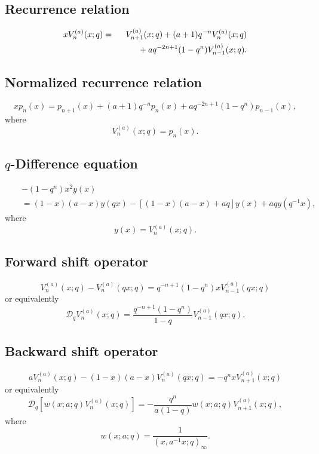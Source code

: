 \documentclass[envcountchap,graybox]{svmono}
\newcommand{\mathindent}{\hspace{7.5mm}}
\begin{document}
{{\subsection*{Recurrence relation}
\begin{eqnarray}
\label{RecAlSalamCarlitzII}
xV_n^{(a)}(x;q)&=&V_{n+1}^{(a)}(x;q)+(a+1)q^{-n}V_n^{(a)}(x;q)\nonumber\\
& &{}\mathindent{}+aq^{-2n+1}(1-q^n)V_{n-1}^{(a)}(x;q).
\end{eqnarray}

\subsection*{Normalized recurrence relation}
\begin{equation}
\label{NormRecAlSalamCarlitzII}
xp_n(x)=p_{n+1}(x)+(a+1)q^{-n}p_n(x)+aq^{-2n+1}(1-q^n)p_{n-1}(x),
\end{equation}
where
$$V_n^{(a)}(x;q)=p_n(x).$$

\subsection*{$q$-Difference equation}
\begin{eqnarray}
\label{dvAlSalamCarlitzII}
& &-(1-q^n)x^2y(x)\nonumber\\
& &{}=(1-x)(a-x)y(qx)-\left[(1-x)(a-x)+aq\right]y(x)+aqy(q^{-1}x),
\end{eqnarray}
where
$$y(x)=V_n^{(a)}(x;q).$$

\subsection*{Forward shift operator}
\begin{equation}
\label{shift1AlSalamCarlitzII-I}
V_n^{(a)}(x;q)-V_n^{(a)}(qx;q)=q^{-n+1}(1-q^n)xV_{n-1}^{(a)}(qx;q)
\end{equation}
or equivalently
\begin{equation}
\label{shift1AlSalamCarlitzII-II}
\mathcal{D}_qV_n^{(a)}(x;q)=\frac{q^{-n+1}(1-q^n)}{1-q}
V_{n-1}^{(a)}(qx;q).
\end{equation}

\subsection*{Backward shift operator}
\begin{equation}
\label{shift2AlSalamCarlitzII-I}
aV_n^{(a)}(x;q)-(1-x)(a-x)V_n^{(a)}(qx;q)=-q^nxV_{n+1}^{(a)}(x;q)
\end{equation}
or equivalently
\begin{equation}
\label{shift2AlSalamCarlitzII-II}
\mathcal{D}_q\left[w(x;a;q)V_n^{(a)}(x;q)\right]
=-\frac{q^n}{a(1-q)}w(x;a;q)V_{n+1}^{(a)}(x;q),
\end{equation}
where
$$w(x;a;q)=\frac{1}{(x,a^{-1}x;q)_{\infty}}.$$

}}
\end{document}
